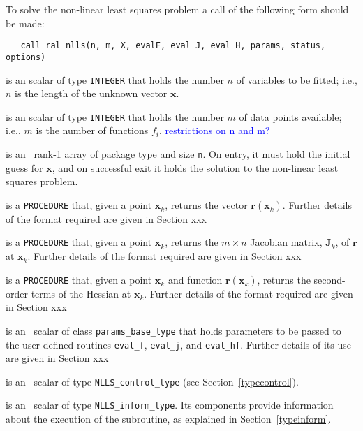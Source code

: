 \documentclass{hslspec}
\newcommand{\scalarintegerii}{is an \intentin scalar of type {\tt INTEGER} }
\newcommand{\vx}{ {\bm x} } %
\newcommand{\vr}{ {\bm r} } %
\newcommand{\vJ}{ {\bm J} } %
\newcommand{\iter}[2][k]{ #2_{#1}^{}} %
\begin{document}
To solve the non-linear least squares problem a call of the following form should be made:

\begin{verbatim}
   call ral_nlls(n, m, X, evalF, eval_J, eval_H, params, status, options)
\end{verbatim}

\begin{description}
 \scalarintegerii that holds the number $n$ of 
variables to be fitted; i.e., $n$ is the length of the unknown vector $\bm x$.

 \scalarintegerii that holds the number $m$ of 
data points available; i.e., $m$ is the number of functions $f_i$.
\textcolor{blue}{restrictions on n and m?}

 is an \intentinout\  rank-1 array of package type 
and size {\tt n}.  On entry, it must hold the initial guess for $\bm x$, and on 
successful exit it holds the solution to the non-linear least squares problem.

 is a {\tt PROCEDURE} that, given a point $\iter{\vx}$, returns the vector $\vr(\iter{\vx})$.  
Further details of the format required are given in Section {\color{red}xxx}

 is a {\tt PROCEDURE} that, given a point $\iter{\vx}$, 
returns the $m \times n$ Jacobian matrix, $\iter{\vJ}$, of $\vr$ at $\iter{\vx}$.  
Further details of the format required are given in Section {\color{red}xxx}

 is a {\tt PROCEDURE} that, given a point $\iter{\vx}$
and function $\vr(\iter{\vx})$, returns the second-order terms of the Hessian at $\iter{\vx}$. 
Further details of the format required are given in Section {\color{red}xxx}

 is an \intentin\ scalar of class {\tt params\_base\_type} that holds parameters to 
be passed to the user-defined routines {\tt eval\_f}, {\tt eval\_j}, and {\tt eval\_hf}. 
Further details of its use are given in Section {\color{red}xxx}

is an \intentin\  scalar  of type {\tt NLLS\_control\_type}
(see Section~\ref{typecontrol}).

 is an \intentinout\ scalar of type 
{\tt NLLS\_inform\_type}. Its components provide information about the execution
of the subroutine, as explained in Section~\ref{typeinform}.

\end{description}
\end{document}
